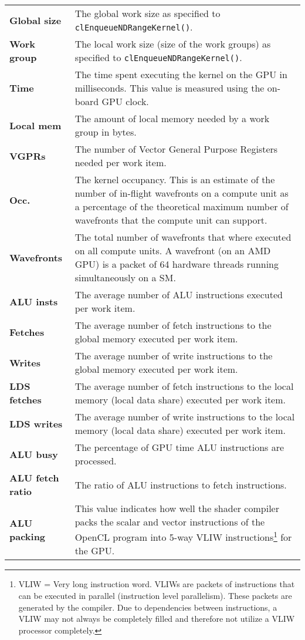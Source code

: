 \begin{table}
	\vspace{\baselineskip}
	
	\begin{tabularx}{\textwidth}{>{\bfseries}l X}
		Global size &
		The global work size as specified to \lstinline!clEnqueueNDRangeKernel()!. \\
		Work group &
		The local work size (size of the work groups) as specified to \lstinline!clEnqueueNDRangeKernel()!. \\
		Time &
		The time spent executing the kernel on the GPU in milliseconds. This value is measured using the on-board GPU clock. \\
		Local mem &
		The amount of local memory needed by a work group in bytes. \\
		VGPRs &
		The number of Vector General Purpose Registers needed per work item. \\
		Occ. &
		The kernel occupancy. This is an estimate of the number of in-flight wavefronts on a compute unit as a percentage of the theoretical maximum number of wavefronts that the compute unit can support. \\
		Wavefronts &
		The total number of wavefronts that where executed on all compute units. A wavefront (on an AMD GPU) is a packet of 64 hardware threads running simultaneously on a SM. \\
		ALU insts &
		The average number of ALU instructions executed per work item. \\
		Fetches &
		The average number of fetch instructions to the global memory executed per work item. \\
		Writes &
		The average number of write instructions to the global memory executed per work item. \\
		LDS fetches &
		The average number of fetch instructions to the local memory (local data share) executed per work item. \\
		LDS writes &
		The average number of write instructions to the local memory (local data share) executed per work item. \\
		ALU busy &
		The percentage of GPU time ALU instructions are processed. \\
		ALU fetch ratio &
		The ratio of ALU instructions to fetch instructions. \\
		ALU packing &
		This value indicates how well the shader compiler packs the scalar and vector instructions of the OpenCL program into 5-way VLIW instructions\footnote{VLIW = Very long instruction word. VLIWs are packets of instructions that can be executed in parallel (instruction level parallelism). These packets are generated by the compiler. Due to dependencies between instructions, a VLIW may not always be completely filled and therefore not utilize a VLIW processor completely.} for the GPU. \\

\end{tabularx}
\end{table}
